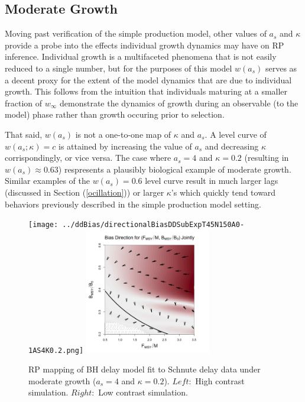 %
\subsection{Moderate Growth}

%
Moving past verification of the simple production model, other values of $a_s$ 
and $\kappa$ provide a probe into the effects individual growth dynamics may 
have on RP inference. 
%
Individual growth is a multifaceted phenomena that is not easily reduced 
to a single number, but for the purposes of this model $w(a_s)$ serves as a decent 
proxy for the extent of the model dynamics that are due to individual growth. %
%
This follows from the intuition that individuals maturing at a smaller fraction 
of $w_\infty$ demonstrate the dynamics of growth during an observable (to the model) %
phase rather than growth occuring prior to selection. %

%
That said, $w(a_s)$ is not a one-to-one map of $\kappa$ and $a_s$.
%
A level curve of $w(a_s; \kappa)=c$ is attained by increasing the value of $a_s$ 
and decreasing $\kappa$ corrispondingly, or vice versa.
%
The case where $a_s=4$ and $\kappa=0.2$ (resulting in $w(a_s)\approx0.63$) 
respresents a plausibly biological example of moderate growth. 
%
Similar examples of the $w(a_s)=0.6$ level curve result in much larger lags 
(discussed in Section (\ref{ocillation})) or larger $\kappa$'s which quickly 
tend toward behaviors previously described in the simple production model 
setting.

%
\begin{figure}[h!]
\texttt{[image: ../ddBias/directionalBiasDDSubExpT45N150A0-1AS4K0.2.png]} %
\includegraphics[width=0.49\textwidth]{../ddBias/directionalBiasDDSubFlatT45N150A0-1AS4K0.2N56.png} %
\caption{
RP mapping of BH delay model fit to Schnute delay data under moderate growth ($a_s=4$ and $\kappa=0.2$). 
$Left:$ High contrast simulation.
$Right:$ Low contrast simulation.
}\label{prodLimit}
\end{figure}


